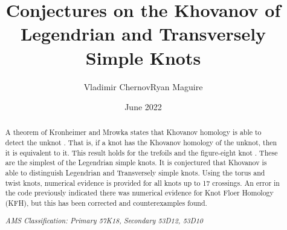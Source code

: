 \documentclass{article}
\title{Conjectures on the Khovanov of Legendrian and Transversely Simple Knots}
\author{Vladimir Chernov\hspace{2em}Ryan Maguire}
\date{June 2022}
\theoremstyle{plain}
\begin{document}
    \maketitle
    \tableofcontents
    \begin{abstract}
        \noindent
        A theorem of Kronheimer and Mrowka states that Khovanov homology is
        able to detect the unknot \cite{kronheimermrowka2010}.
        That is, if a knot has the Khovanov homology of the unknot, then it is
        equivalent to it. This result holds for the trefoils
        \cite{BaldwinSivekKhovanovTrefoils} and the figure-eight knot
        \cite{BaldwinDowlinKhovanovFigureEight}. These are the
        simplest of the Legendrian simple knots. It is conjectured that
        Khovanov is able to distinguish Legendrian and Transversely simple
        knots. Using the torus and twist knots, numerical evidence is provided
        for all knots up to 17 crossings. An error in the code previously
        indicated there was numerical evidence for Knot Floer Homology (KFH),
        but this has been corrected and counterexamples found.
        \par\hfill\par
        \textit{AMS Classification: Primary 57K18, Secondary 53D12, 53D10}
    \end{abstract}
\end{document}
